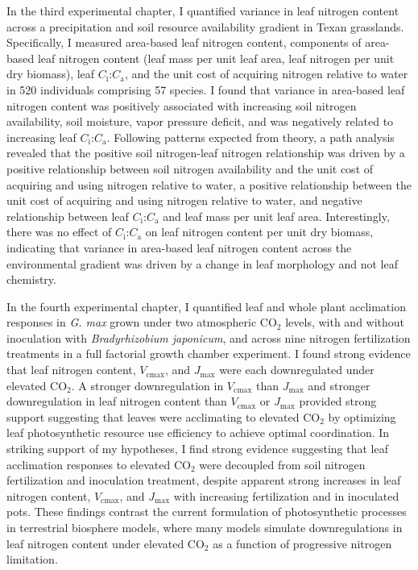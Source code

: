 In the third experimental chapter, I quantified variance in leaf nitrogen content across a precipitation and soil resource availability gradient in Texan grasslands. Specifically, I measured area-based leaf nitrogen content, components of area-based leaf nitrogen content (leaf mass per unit leaf area, leaf nitrogen per unit dry biomass), leaf $C_\mathrm{i}$:$C_\mathrm{a}$, and the unit cost of acquiring nitrogen relative to water in 520 individuals comprising 57 species. I found that variance in area-based leaf nitrogen content was positively associated with increasing soil nitrogen availability, soil moisture, vapor pressure deficit, and was negatively related to increasing leaf $C_\mathrm{i}$:$C_\mathrm{a}$. Following patterns expected from theory, a path analysis revealed that the positive soil nitrogen-leaf nitrogen relationship was driven by a positive relationship between soil nitrogen availability and the unit cost of acquiring and using nitrogen relative to water, a positive relationship between the unit cost of acquiring and using nitrogen relative to water, and negative relationship between leaf $C_\mathrm{i}$:$C_\mathrm{a}$ and leaf mass per unit leaf area. Interestingly, there was no effect of $C_\mathrm{i}$:$C_\mathrm{a}$ on leaf nitrogen content per unit dry biomass, indicating that variance in area-based leaf nitrogen content across the environmental gradient was driven by a change in leaf morphology and not leaf chemistry.

In the fourth experimental chapter, I quantified leaf and whole plant acclimation responses in \textit{G. max} grown under two atmospheric CO$_2$ levels, with and without inoculation with \textit{Bradyrhizobium japonicum}, and across nine nitrogen fertilization treatments in a full factorial growth chamber experiment. I found strong evidence that leaf nitrogen content, $V_\mathrm{cmax}$, and $J_\mathrm{max}$ were each downregulated under elevated CO$_2$. A stronger downregulation in $V_\mathrm{cmax}$ than $J_\mathrm{max}$ and stronger downregulation in leaf nitrogen content than $V_\mathrm{cmax}$ or $J_\mathrm{max}$ provided strong support suggesting that leaves were acclimating to elevated CO$_2$ by optimizing leaf photosynthetic resource use efficiency to achieve optimal coordination. In striking support of my hypotheses, I find strong evidence suggesting that leaf acclimation responses to elevated CO$_2$ were decoupled from soil nitrogen fertilization and inoculation treatment, despite apparent strong increases in leaf nitrogen content, $V_\mathrm{cmax}$, and $J_\mathrm{max}$ with increasing fertilization and in inoculated pots. These findings contrast the current formulation of photosynthetic processes in terrestrial biosphere models, where many models simulate downregulations in leaf nitrogen content under elevated CO$_2$ as a function of progressive nitrogen limitation.

